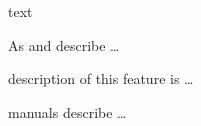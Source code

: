 \documentclass{article}
\begin{document}
text \cite[postfix]{inbook-full}

As  and  describe \ldots

 description of this feature is \ldots

manuals  describe \ldots

\citeyear{inbook-full}




\end{document}
